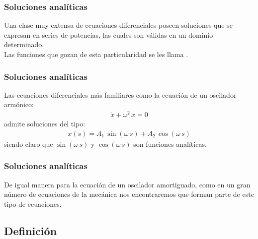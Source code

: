 \documentclass[12pt]{beamer}
\begin{document}
\begin{frame}
\frametitle{Soluciones analíticas}
Una clase muy extensa de ecuaciones diferenciales poseen soluciones que se expresan en series de potencias, las cuales son válidas en un dominio determinado.
\\
\bigskip
\pause
Las funciones que gozan de esta particularidad se les llama .
\end{frame}
\begin{frame}
\frametitle{Soluciones analíticas}
Las ecuaciones diferenciales más familiares como la ecuación de un oscilador armónico:
\pause
\begin{align*}
\ddot{x} + \omega^{2} \, x = 0
\end{align*}
\pause
 admite soluciones del tipo:
\pause
\begin{align*}
x (s) = A_{1} \, \sin(\omega \, s) + A_{2} \, \cos (\omega \, s)
\end{align*}
siendo claro que $\sin (\omega \, s)$ y $\cos(\omega \, s)$ son funciones analíticas.
\end{frame}
\begin{frame}
\frametitle{Soluciones analíticas}
De igual manera para la ecuación de un oscilador amortiguado, como en un gran número de ecuaciones de la mecánica nos encontraremos que forman parte de este tipo de ecuaciones.
\end{frame}

\subsection{Definición}
\end{document}
